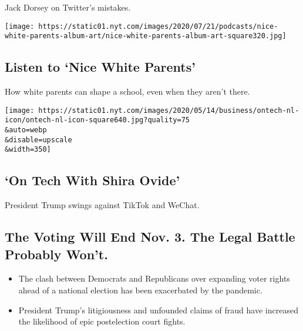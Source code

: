 Jack Dorsey on Twitter's mistakes.

\href{/2020/08/06/podcasts/episode-three-this-is-our-school-how-dare-you.html}{}

\texttt{[image: https://static01.nyt.com/images/2020/07/21/podcasts/nice-white-parents-album-art/nice-white-parents-album-art-square320.jpg]}

\href{/2020/08/06/podcasts/episode-three-this-is-our-school-how-dare-you.html}{}

\hypertarget{listen-to-nice-white-parents}{%
\subsection{Listen to `Nice White
Parents'}\label{listen-to-nice-white-parents}}

How white parents can shape a school, even when they aren't there.

\href{/2020/08/07/technology/trump-tiktok-wechat.html}{}

\texttt{[image: https://static01.nyt.com/images/2020/05/14/business/ontech-nl-icon/ontech-nl-icon-square640.jpg?quality=75\\\&auto=webp\\\&disable=upscale\\\&width=350]}

\href{/2020/08/07/technology/trump-tiktok-wechat.html}{}

\hypertarget{on-tech-with-shira-ovide}{%
\subsection{`On Tech With Shira Ovide'}\label{on-tech-with-shira-ovide}}

President Trump swings against TikTok and WeChat.

\href{/2020/08/08/us/politics/voting-nov-3-election.html}{}

\hypertarget{the-voting-will-end-nov-3-the-legal-battle-probably-wont}{%
\subsection{The Voting Will End Nov. 3. The Legal Battle Probably
Won't.}\label{the-voting-will-end-nov-3-the-legal-battle-probably-wont}}

\begin{itemize}
\tightlist
\item
  The clash between Democrats and Republicans over expanding voter
  rights ahead of a national election has been exacerbated by the
  pandemic.
\item
  President Trump's litigiousness and unfounded claims of fraud have
  increased the likelihood of epic postelection court fights.
\end{itemize}

